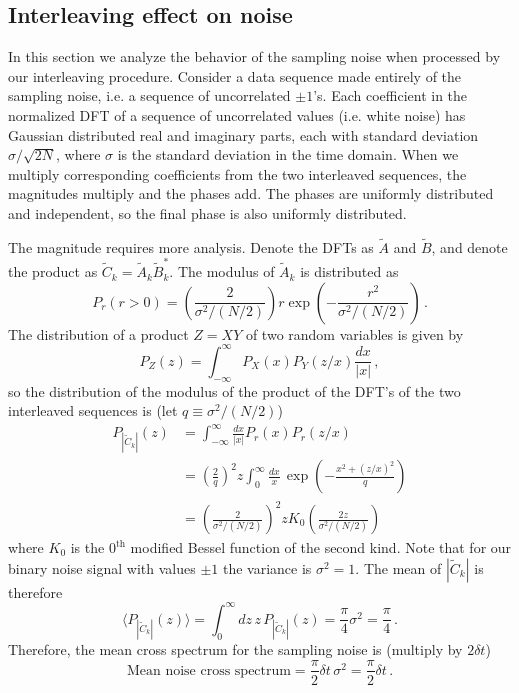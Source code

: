 \documentclass[twocolumn]{article}
\begin{document}
\subsection{Interleaving effect on noise}

In this section we analyze the behavior of the sampling noise when processed by our interleaving procedure.
Consider a data sequence made entirely of the sampling noise, i.e. a sequence of uncorrelated $\pm1$'s.
Each coefficient in the normalized DFT of a sequence of uncorrelated values (i.e. white noise) has Gaussian distributed real and imaginary parts, each with standard deviation $\sigma / \sqrt{2N}$, where $\sigma$ is the standard deviation in the time domain.
When we multiply corresponding coefficients from the two interleaved sequences, the magnitudes multiply and the phases add.
The phases are uniformly distributed and independent, so the final phase is also uniformly distributed.

The magnitude requires more analysis.
Denote the DFTs as $\tilde{A}$ and $\tilde{B}$, and denote the product as $\tilde{C}_k = \tilde{A}_k \tilde{B}_k^*$.
The modulus of $\tilde{A}_k$ is distributed as
\begin{equation}
P_r(r>0) = \left( \frac{2}{\sigma^2 / (N/2)} \right) r \exp \left( - \frac{r^2}{\sigma^2 / (N/2)} \right) \, .
\end{equation}
The distribution of a product $Z = XY$ of two random variables is given by
\begin{equation}
P_Z(z) = \int_{-\infty}^\infty P_X(x) P_Y(z/x) \frac{dx}{|x|} \, ,
\end{equation}
so the distribution of the modulus of the product of the DFT's of the two interleaved sequences is (let $q \equiv \sigma^2 / (N/2)$)
\begin{align}
P_{\left\lvert \tilde{C}_k \right \rvert}(z)
&= \int_{-\infty}^\infty \frac{dx}{|x|} P_r(x) P_r(z/x) \nonumber \\
&= \left( \frac{2}{q} \right)^2
z \int_0^\infty \frac{dx}{x} \,
\exp \left( - \frac{x^2 + (z/x)^2}{q} \right) \nonumber \\
&= \left( \frac{2}{\sigma^2 / (N/2)} \right)^2
z K_0 \left( \frac{2z}{\sigma^2 / (N/2)} \right)
\end{align}
where $K_0$ is the $0^\text{th}$ modified Bessel function of the second kind.
Note that for our binary noise signal with values $\pm 1$ the variance is $\sigma^2 = 1$.
The mean of $\left \lvert \tilde{C}_k \right \rvert$ is therefore
\begin{equation}
\langle P_{\left \lvert \tilde{C}_k \right\rvert}(z) \rangle
= \int_0^\infty dz \, z \, P_{\left \lvert \tilde{C}_k \right \rvert}(z)
= \frac{\pi}{4} \sigma^2 = \frac{\pi}{4}\, .
\end{equation}
Therefore, the mean cross spectrum for the sampling noise is (multiply by $2 \delta t$)
\begin{equation}
\text{Mean noise cross spectrum} = \frac{\pi}{2} \delta t \, \sigma^2 = \frac{\pi}{2} \delta t \, .
\end{equation}
\end{document}

